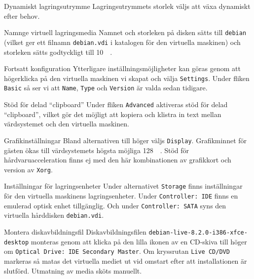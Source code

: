            {Dynamiskt lagringsutrymme}
           {Lagringsutrymmets storlek väljs att växa dynamiskt efter behov.}
           {}

           {Namnge virtuell lagringsmedia}
           {Namnet och storleken på disken sätts till \texttt{debian} (vilket
            ger ett filnamn \texttt{debian.vdi} i katalogen för den virtuella
            maskinen) och storleken sätts godtyckligt till \SI{10}{\mega\byte}.}
           {}

           {Fortsatt konfiguration}
           {Ytterligare inställningsmöjligheter kan göras genom att högerklicka
            på den virtuella maskinen vi skapat och välja \texttt{Settings}.
            Under fliken \texttt{Basic} så ser vi att \texttt{Name}, \texttt{Type}
            och \texttt{Version} är valda sedan tidigare.}
           {}

           {Stöd för delad ``clipboard''}
           {Under fliken \texttt{Advanced} aktiveras stöd för delad ``clipboard'',
            vilket gör det möjligt att kopiera och klistra in text mellan
            värdsystemet och den virtuella maskinen.}
           {}

           {Grafikinställningar}
           {Bland alternativen till höger väljs \texttt{Display}.
            Grafikminnet för gästen ökas till värdsystemets högsta möjliga
            \SI{128}{\mega\byte}. Stöd för hårdvaruacceleration finns ej med
            den här kombinationen av grafikkort och version av \texttt{Xorg}.}
           {}

           {Inställningar för lagringsenheter}
           {Under alternativet \texttt{Storage} finns inställningar för den
            virtuella maskinens lagringsenheter. Under \texttt{Controller: IDE}
            finns en emulerad optisk enhet tillgänglig.
            Och under \texttt{Controller: SATA} syns den virtuella hårddisken
            \texttt{debian.vdi}.}
           {}

           {Montera diskavbildningsfil}
           {Diskavbildningsfilen \texttt{debian-live-8.2.0-i386-xfce-desktop} monteras
            genom att klicka på den lilla ikonen av en CD-skiva till höger om
            \texttt{Optical Drive: IDE Secondary Master}. Om kryssrutan
            \texttt{Live CD/DVD} markeras så matas det virtuella mediet ut vid omstart
            efter att installationen är slutförd. Utmatning av media sköts manuellt.}
           {}

